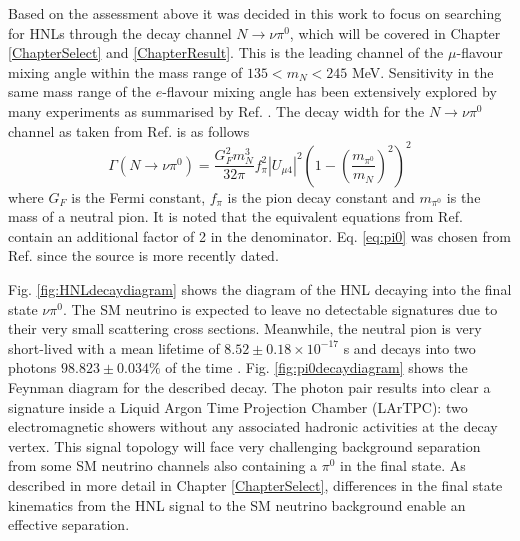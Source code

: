 Based on the assessment above it was decided in this work to focus on searching for HNLs through the decay channel $N\rightarrow\nu \pi^{0}$, which will be covered in Chapter \ref{ChapterSelect} and \ref{ChapterResult}.  
This is the leading channel of the $\mu$-flavour mixing angle within the mass range of $ 135 < m_{N} < 245 $ MeV.
Sensitivity in the same mass range of the $e$-flavour mixing angle has been extensively explored by many experiments as summarised by Ref. \cite{HNLWhitePaper}.
The decay width for the $N\rightarrow\nu \pi^{0}$ channel as taken from Ref. \cite{HNLZarko} is as follows
\begin{equation}
	\Gamma(N\rightarrow \nu \pi^{0}) = \frac{G_{F}^{2}m_{N}^{3}}{32\pi}f^{2}_{\pi}|U_{\mu4}|^{2}\left(1-\left(\frac{m_{\pi^{0}}}{m_{N}}\right)^{2}\right)^{2}
\label{eq:pi0}
\end{equation}
where $G_{F}$ is the Fermi constant, $f_{\pi}$ is the pion decay constant and $m_{\pi^{0}}$ is the mass of a neutral pion.
It is noted that the equivalent equations from Ref. \cite{SBNHNL, HNLBin} contain an additional factor of 2 in the denominator.
Eq. \ref{eq:pi0} was chosen from Ref. \cite{HNLZarko} since the source is more recently dated. 

Fig. \ref{fig:HNLdecaydiagram} shows the diagram of the HNL decaying into the final state $\nu\pi^0$.
The SM neutrino is expected to leave no detectable signatures due to their very small scattering cross sections.
Meanwhile, the neutral pion is very short-lived with a mean lifetime of $8.52\pm0.18 \times 10^{-17}$ s and decays into two photons $98.823 \pm 0.034 \%$ of the time \cite{PDG}. 
Fig. \ref{fig:pi0decaydiagram} shows the Feynman diagram for the described decay.
The photon pair results into clear a signature inside a Liquid Argon Time Projection Chamber (LArTPC): two electromagnetic showers without any associated hadronic activities at the decay vertex.
This signal topology will face very challenging background separation from some SM neutrino channels also containing a $\pi^0$ in the final state.
As described in more detail in Chapter \ref{ChapterSelect}, differences in the final state kinematics from the HNL signal to the SM neutrino background enable an effective separation.


